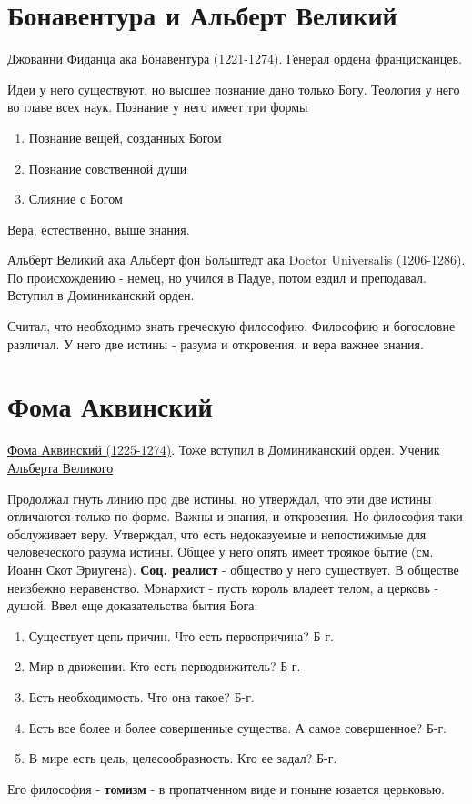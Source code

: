 \documentclass[12pt,a4paper]{article}
\begin{document}
\section{Бонавентура и Альберт Великий}

\underline{Джованни Фиданца ака Бонавентура (1221-1274)}. Генерал ордена францисканцев. 

Идеи у него существуют, но высшее познание дано только Богу. Теология у него во главе всех наук. Познание у него имеет три формы
\begin{enumerate}
\item Познание вещей, созданных Богом
\item Познание совственной души
\item Слияние с Богом
\end{enumerate}
Вера, естественно, выше знания.


\underline{Альберт Великий  ака Альберт фон Больштедт ака Doctor Universalis (1206-1286)}. По происхождению - немец, но учился в Падуе, потом ездил и преподавал. Вступил в Доминиканский орден.

Считал, что необходимо знать греческую философию. Философию и богословие различал. У него две истины - разума и откровения, и вера важнее знания.

\section{Фома Аквинский}

\underline{Фома Аквинский (1225-1274)}. Тоже вступил в Доминиканский орден. Ученик \underline{Альберта Великого} 

Продолжал гнуть линию про две истины, но утверждал, что эти две истины отличаются только по форме. Важны и знания, и откровения. Но философия таки обслуживает веру. Утверждал, что есть недоказуемые и непостижимые для человеческого разума истины. Общее у него опять имеет троякое бытие (см. Иоанн Скот Эриугена). \textbf{Соц. реалист} - общество у него существует. В обществе неизбежно неравенство. Монархист - пусть король владеет телом, а церковь - душой. Ввел еще доказательства бытия Бога:
\begin{enumerate}
\item Существует цепь причин. Что есть первопричина? Б-г.
\item Мир в движении. Кто есть перводвижитель? Б-г.
\item Есть необходимость. Что она такое? Б-г.
\item Есть все более и более совершенные существа. А самое совершенное? Б-г.
\item В мире есть цель, целесообразность. Кто ее задал? Б-г.
\end{enumerate}
Его философия - \textbf{томизм} - в пропатченном виде и поныне юзается церьковью.
\end{document}
